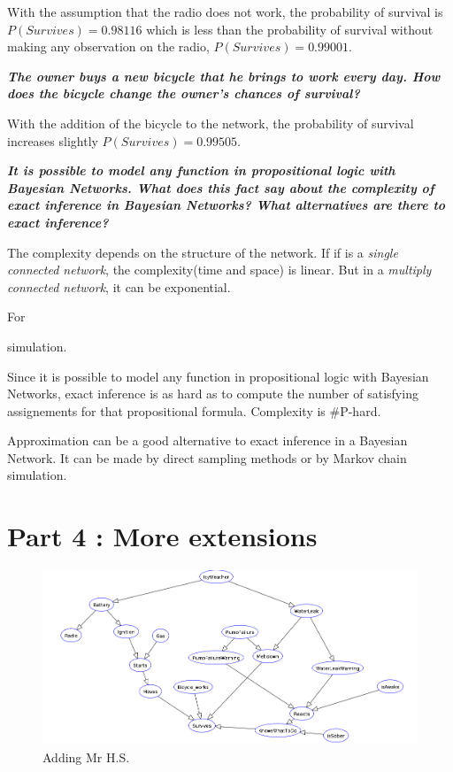 \vspace{1em}
With the assumption that the radio does not work, the probability of survival
is \textbf{$P(Survives)=0.98116$} which is less than the probability of survival
without making any
observation on the radio, \textbf{$P(Survives)=0.99001$}.

\textit{\textbf{The owner buys a new bicycle that he brings to work every day.
How does the bicycle change the owner's chances of survival?}}

\vspace{1em}
With the addition of the bicycle to the network, the probability of survival
increases slightly $P(Survives)=0.99505$.

\textit{\textbf{It is possible to model any function in propositional
logic with Bayesian Networks. What does this fact say about the complexity
of exact inference in Bayesian Networks? What alternatives are there
to exact inference?}}

The complexity depends on the structure of the network. If if is a
\textit{single
connected network}, the complexity(time and space) is linear. But in a
\textit{multiply connected network}, it can be exponential.

For

simulation.

Since it is possible to model any function in propositional logic with Bayesian
Networks, exact inference is as hard as to compute the number of satisfying
assignements for that propositional formula. Complexity is \#P-hard.

Approximation can be a good alternative to exact inference in a Bayesian
Network. It can be made by direct sampling methods or by Markov chain
simulation.

\newpage
\thispagestyle{empty}
\section*{Part 4 : More extensions}

\begin{figure}[h]
    \centering
      \includegraphics[width=0.83\linewidth]{./images/lab3.png}
    \caption{Adding Mr H.S.\label{graph}}
\end{figure}

